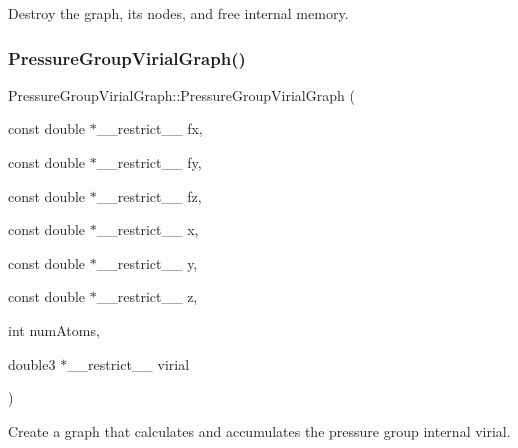Destroy the graph, its nodes, and free internal memory. 

\hypertarget{classPressureGroupVirialGraph_acc008fb3d4ecd0443509fb21c92ba592}{}\label{classPressureGroupVirialGraph_acc008fb3d4ecd0443509fb21c92ba592} 
\subsubsection{\texorpdfstring{Pressure\+Group\+Virial\+Graph()}{PressureGroupVirialGraph()}\hspace{0.1cm}{\footnotesize\ttfamily [2/2]}}
{\footnotesize\ttfamily Pressure\+Group\+Virial\+Graph\+::\+Pressure\+Group\+Virial\+Graph (\begin{DoxyParamCaption}\item[{const double $\ast$\+\_\+\+\_\+restrict\+\_\+\+\_\+}]{fx,  }\item[{const double $\ast$\+\_\+\+\_\+restrict\+\_\+\+\_\+}]{fy,  }\item[{const double $\ast$\+\_\+\+\_\+restrict\+\_\+\+\_\+}]{fz,  }\item[{const double $\ast$\+\_\+\+\_\+restrict\+\_\+\+\_\+}]{x,  }\item[{const double $\ast$\+\_\+\+\_\+restrict\+\_\+\+\_\+}]{y,  }\item[{const double $\ast$\+\_\+\+\_\+restrict\+\_\+\+\_\+}]{z,  }\item[{int}]{num\+Atoms,  }\item[{double3 $\ast$\+\_\+\+\_\+restrict\+\_\+\+\_\+}]{virial }\end{DoxyParamCaption})}



Create a graph that calculates and accumulates the pressure group internal virial. 


